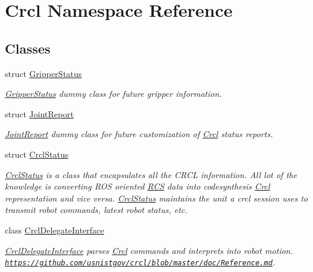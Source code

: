\hypertarget{namespaceCrcl}{\section{Crcl Namespace Reference}
\label{namespaceCrcl}
}
\subsection*{Classes}
\begin{DoxyCompactItemize}
\item 
struct \hyperlink{structCrcl_1_1GripperStatus}{Gripper\-Status}
\begin{DoxyCompactList}\small\item\em \hyperlink{structCrcl_1_1GripperStatus}{Gripper\-Status} dummy class for future gripper information. \end{DoxyCompactList}\item 
struct \hyperlink{structCrcl_1_1JointReport}{Joint\-Report}
\begin{DoxyCompactList}\small\item\em \hyperlink{structCrcl_1_1JointReport}{Joint\-Report} dummy class for future customization of \hyperlink{namespaceCrcl}{Crcl} status reports. \end{DoxyCompactList}\item 
struct \hyperlink{structCrcl_1_1CrclStatus}{Crcl\-Status}
\begin{DoxyCompactList}\small\item\em \hyperlink{structCrcl_1_1CrclStatus}{Crcl\-Status} is a class that encapsulates all the C\-R\-C\-L information. All lot of the knowledge is converting R\-O\-S oriented \hyperlink{namespaceRCS}{R\-C\-S} data into codesynthesis \hyperlink{namespaceCrcl}{Crcl} representation and vice versa. \hyperlink{structCrcl_1_1CrclStatus}{Crcl\-Status} maintains the unit a crcl session uses to transmit robot commands, latest robot status, etc. \end{DoxyCompactList}\item 
class \hyperlink{classCrcl_1_1CrclDelegateInterface}{Crcl\-Delegate\-Interface}
\begin{DoxyCompactList}\small\item\em \hyperlink{classCrcl_1_1CrclDelegateInterface}{Crcl\-Delegate\-Interface} parses \hyperlink{namespaceCrcl}{Crcl} commands and interprets into robot motion. \href{https://github.com/usnistgov/crcl/blob/master/doc/Reference.md}{\tt https\-://github.\-com/usnistgov/crcl/blob/master/doc/\-Reference.\-md}. \end{DoxyCompactList}\item 

\end{DoxyCompactItemize}
